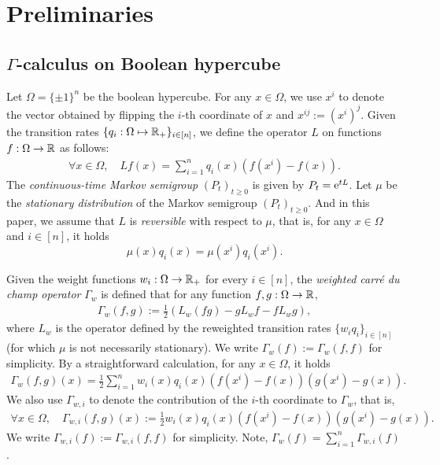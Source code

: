 \section{Preliminaries}
\subsection{$\Gamma$-calculus on Boolean hypercube}
Let $\Omega = \{\pm 1\}^n$ be the boolean hypercube.
For any $x \in \Omega$, we use $x^i$ to denote the vector obtained by flipping the $i$-th coordinate of $x$ and $x^{ij} := (x^i)^j$.
Given the transition rates $\{q_i: \Omega \mapsto \mathbb{R}_+\}_{i\in[n]}$, we define the operator $L$ on functions $f:\Omega \to \mathbb{R}$ as follows:
\begin{align*}
    \forall x \in \Omega,\quad Lf(x) = \sum_{i=1}^n q_i(x)(f(x^i) - f(x)).
\end{align*}
The \textit{continuous-time Markov semigroup} $(P_t)_{t\geq 0}$ is given by $P_t = \mathrm{e}^{t L}$.
Let $\mu$ be the \textit{stationary distribution} of the Markov semigroup $(P_t)_{t\geq 0}$.
And in this paper, we assume that $L$ is \textit{reversible} with respect to $\mu$, that is, for any $x\in \Omega$ and $i\in [n]$, it holds 
$$\mu(x)q_i(x) = \mu(x^i)q_i(x^i).$$

\begin{definition}
    Given the weight functions $w_i: \Omega \to \mathbb{R}_+$ for every $i\in [n]$, the \textit{weighted carr\'e du champ operator} $\Gamma_w$ is defined that for any function $f,g:\Omega \to \mathbb{R}$,
    \begin{align*}
        \Gamma_w(f,g) := \frac 12 (L_w(fg)-gL_wf-fL_wg),
    \end{align*}
    where $L_w$ is the operator defined by the reweighted transition rates $\{w_iq_i\}_{i\in[n]}$ (for which $\mu$ is not necessarily stationary). 
    We write $\Gamma_w(f) := \Gamma_w(f,f)$ for simplicity.
    By a straightforward calculation, for any $x \in \Omega$, it holds
    \begin{align*}
       \Gamma_w(f,g)(x) = \frac 12\sum_{i=1}^n w_i(x)q_i(x)(f(x^i) - f(x))(g(x^i) - g(x)).
    \end{align*}
    We also use $\Gamma_{w,i}$ to denote the contribution of the $i$-th coordinate to $\Gamma_w$, that is, 
    \begin{align*}
        \forall x \in \Omega,\quad \Gamma_{w,i}(f,g)(x) := \frac 12 w_i(x)q_i(x)(f(x^i) - f(x))(g(x^i) - g(x)).
    \end{align*}
    We write $\Gamma_{w,i}(f) := \Gamma_{w,i}(f,f)$ for simplicity.
    Note, $\Gamma_w(f) = \sum_{i=1}^n \Gamma_{w,i}(f)$.
\end{definition}

